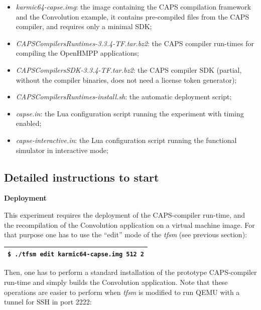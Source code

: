 \documentclass[a4paper]{article}
\begin{document}
\begin{itemize}
\item {
\textit{karmic64-capse.img}: the image containing the CAPS compilation
framework and the Convolution example, it contains pre-compiled files
from the CAPS compiler, and requires only a minimal SDK;}
\item {
\textit{CAPSCompilersRuntimes-3.3.4-TF.tar.bz2}: the CAPS compiler
run-times for compiling the OpenHMPP applications;}
\item {
\textit{CAPSCompilersSDK-3.3.4-TF.tar.bz2}: the CAPS compiler SDK
(partial, without the compiler binaries, does not need a license token
generator);}
\item {
\textit{CAPSCompilersRuntimes-install.sh}: the automatic deployment
script;}
\item {
\textit{capse.in}: the Lua configuration script running the experiment
with timing enabled;}
\item {
\textit{capse-interactive.in}: the Lua configuration script running the
functional simulator in interactive mode;}
\end{itemize}
\subsection[Detailed instructions to start]{Detailed instructions to
start}
{\bfseries
Deployment}

{
This experiment requires the deployment of the CAPS-compiler run-time,
and the recompilation of the Convolution application on a virtual
machine image. For that purpose one has to use the
{\textquotedblleft}edit{\textquotedblright} mode of the \textit{tfsm}
(see previous section):}

\begin{flushleft}
\tablehead{}
\begin{supertabular}{|m{6.15046in}|}
\hline
{} \texttt{\$ ./tfsm edit karmic64-capse.img 512
2}\\\hline
\end{supertabular}
\end{flushleft}
{
Then, one has to perform a standard installation of the prototype
CAPS-compiler run-time and simply builds the Convolution application.
Note that these operations are easier to perform when \textit{tfsm} is
modified to run QEMU with a tunnel for SSH in port 2222:}
\end{document}
